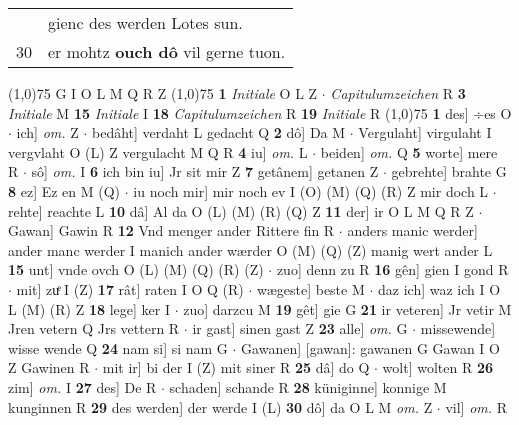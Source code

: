 \documentclass[8pt,a4paper,notitlepage]{article}
\begin{document}
\begin{table}[ht]
\begin{minipage}[t]{0.5\linewidth}
\begin{tabular}{rl}
 & gienc des werden Lotes sun.\\ 
30 & er mohtz \textbf{ouch dô} vil gerne tuon.\\ 
\end{tabular}
\scriptsize
\line(1,0){75} \newline
G I O L M Q R Z \newline
\line(1,0){75} \newline
\textbf{1} \textit{Initiale} O L Z   $\cdot$ \textit{Capitulumzeichen} R  \textbf{3} \textit{Initiale} M  \textbf{15} \textit{Initiale} I  \textbf{18} \textit{Capitulumzeichen} R  \textbf{19} \textit{Initiale} R  \newline
\line(1,0){75} \newline
\textbf{1} des] ÷es O  $\cdot$ ich] \textit{om.} Z  $\cdot$ bedâht] verdaht L gedacht Q \textbf{2} dô] Da M  $\cdot$ Vergulaht] virgulaht I vergvlaht O (L) Z vergulacht M Q R \textbf{4} iu] \textit{om.} L  $\cdot$ beiden] \textit{om.} Q \textbf{5} worte] mere R  $\cdot$ sô] \textit{om.} I \textbf{6} ich bin iu] Jr sit mir Z \textbf{7} getânem] getanen Z  $\cdot$ gebrehte] brahte G \textbf{8} ez] Ez en M (Q)  $\cdot$ iu noch mir] mir noch ev I (O) (M) (Q) (R) Z mir doch L  $\cdot$ rehte] reachte L \textbf{10} dâ] Al da O (L) (M) (R) (Q) Z \textbf{11} der] ir O L M Q R Z  $\cdot$ Gawan] Gawin R \textbf{12} Vnd menger ander Rittere fin R  $\cdot$ anders manic werder] ander manc werder I manich ander wærder O (M) (Q) (Z) manig wert ander L \textbf{15} unt] vnde ovch O (L) (M) (Q) (R) (Z)  $\cdot$ zuo] denn zu R \textbf{16} gên] gien I gond R  $\cdot$ mit] zuͤ I (Z) \textbf{17} rât] raten I O Q (R)  $\cdot$ wægeste] beste M  $\cdot$ daz ich] waz ich I O L (M) (R) Z \textbf{18} lege] ker I  $\cdot$ zuo] darzcu M \textbf{19} gêt] gie G \textbf{21} ir veteren] Jr vetir M Jren vetern Q Jrs vettern R  $\cdot$ ir gast] sinen gast Z \textbf{23} alle] \textit{om.} G  $\cdot$ missewende] wisse wende Q \textbf{24} nam si] si nam G  $\cdot$ Gawanen] [gawan]: gawanen G Gawan I O Z Gawinen R  $\cdot$ mit ir] bi der I (Z) mit siner R \textbf{25} dâ] do Q  $\cdot$ wolt] wolten R \textbf{26} zim] \textit{om.} I \textbf{27} des] De R  $\cdot$ schaden] schande R \textbf{28} küniginne] konnige M kunginnen R \textbf{29} des werden] der werde I (L) \textbf{30} dô] da O L M \textit{om.} Z  $\cdot$ vil] \textit{om.} R \newline
\end{minipage}
\hspace{0.5cm}
\begin{minipage}[t]{0.5\linewidth}

\end{minipage}
\end{table}
\end{document}
